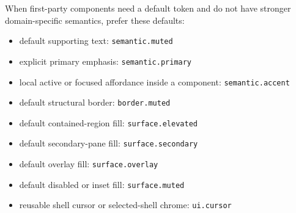 When first-party components need a default token and do not have stronger domain-specific semantics, prefer these defaults:

\begin{itemize}
\tightlist
\item
  default supporting text: \texttt{s\allowbreak{}e\allowbreak{}m\allowbreak{}a\allowbreak{}n\allowbreak{}t\allowbreak{}i\allowbreak{}c\allowbreak{}.\allowbreak{}m\allowbreak{}u\allowbreak{}t\allowbreak{}e\allowbreak{}d}
\item
  explicit primary emphasis: \texttt{s\allowbreak{}e\allowbreak{}m\allowbreak{}a\allowbreak{}n\allowbreak{}t\allowbreak{}i\allowbreak{}c\allowbreak{}.\allowbreak{}p\allowbreak{}r\allowbreak{}i\allowbreak{}m\allowbreak{}a\allowbreak{}r\allowbreak{}y}
\item
  local active or focused affordance inside a component: \texttt{s\allowbreak{}e\allowbreak{}m\allowbreak{}a\allowbreak{}n\allowbreak{}t\allowbreak{}i\allowbreak{}c\allowbreak{}.\allowbreak{}a\allowbreak{}c\allowbreak{}c\allowbreak{}e\allowbreak{}n\allowbreak{}t}
\item
  default structural border: \texttt{b\allowbreak{}o\allowbreak{}r\allowbreak{}d\allowbreak{}e\allowbreak{}r\allowbreak{}.\allowbreak{}m\allowbreak{}u\allowbreak{}t\allowbreak{}e\allowbreak{}d}
\item
  default contained-region fill: \texttt{s\allowbreak{}u\allowbreak{}r\allowbreak{}f\allowbreak{}a\allowbreak{}c\allowbreak{}e\allowbreak{}.\allowbreak{}e\allowbreak{}l\allowbreak{}e\allowbreak{}v\allowbreak{}a\allowbreak{}t\allowbreak{}e\allowbreak{}d}
\item
  default secondary-pane fill: \texttt{s\allowbreak{}u\allowbreak{}r\allowbreak{}f\allowbreak{}a\allowbreak{}c\allowbreak{}e\allowbreak{}.\allowbreak{}s\allowbreak{}e\allowbreak{}c\allowbreak{}o\allowbreak{}n\allowbreak{}d\allowbreak{}a\allowbreak{}r\allowbreak{}y}
\item
  default overlay fill: \texttt{s\allowbreak{}u\allowbreak{}r\allowbreak{}f\allowbreak{}a\allowbreak{}c\allowbreak{}e\allowbreak{}.\allowbreak{}o\allowbreak{}v\allowbreak{}e\allowbreak{}r\allowbreak{}l\allowbreak{}a\allowbreak{}y}
\item
  default disabled or inset fill: \texttt{s\allowbreak{}u\allowbreak{}r\allowbreak{}f\allowbreak{}a\allowbreak{}c\allowbreak{}e\allowbreak{}.\allowbreak{}m\allowbreak{}u\allowbreak{}t\allowbreak{}e\allowbreak{}d}
\item
  reusable shell cursor or selected-shell chrome: \texttt{u\allowbreak{}i\allowbreak{}.\allowbreak{}c\allowbreak{}u\allowbreak{}r\allowbreak{}s\allowbreak{}o\allowbreak{}r}

\end{itemize}
